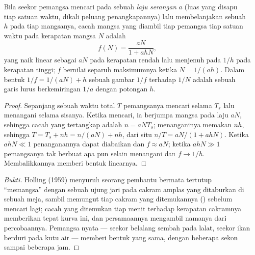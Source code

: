 \begin{theorem}\label{thm:b1:species-interactions:holling}
Bila seekor pemangsa mencari pada sebuah \emph{laju serangan} $a$
(luas yang disapu tiap satuan waktu, dikali peluang penangkapannya)
lalu membelanjakan sebuah  $h$ pada tiap mangsanya,
cacah mangsa yang diambil tiap pemangsa tiap satuan waktu pada
kerapatan mangsa $N$ adalah
\[
f(N) = \frac{aN}{1 + ahN} ,
\]
yang naik linear sebagai $aN$ pada kerapatan rendah lalu menjenuh pada
$1/h$ pada kerapatan tinggi; $f$ bernilai separuh maksimumnya ketika
$N = 1/(ah)$. Dalam bentuk $1/f = 1/(aN) + h$ sebuah gambar $1/f$
terhadap $1/N$ adalah sebuah garis lurus berkemiringan $1/a$ dengan
potongan $h$.
\end{theorem}
\begin{proof}
Sepanjang sebuah waktu total $T$ pemangsanya mencari selama $T_s$ lalu
menangani selama sisanya. Ketika mencari, ia berjumpa mangsa pada laju
$aN$, sehingga cacah yang tertangkap adalah $n = aN T_s$; menanganinya
memakan $nh$, sehingga $T = T_s + nh =
n/(aN) + nh$, dari situ $n/T = aN/(1 + ahN)$. Ketika $ahN \ll 1$
penanganannya dapat diabaikan dan $f \approx aN$; ketika $ahN \gg 1$
pemangsanya tak berbuat apa pun selain menangani dan $f \to 1/h$.
Membalikkannya memberi bentuk linearnya.
\end{proof}
\begin{proof}[Bukti]
Holling (1959) menyuruh seorang pembantu bermata tertutup ``memangsa''
dengan sebuah ujung jari pada cakram amplas yang ditaburkan di sebuah
meja, sambil memungut tiap cakram yang ditemukannya () sebelum mencari lagi; cacah yang ditemukan tiap menit
terhadap kerapatan cakramnya memberikan tepat kurva ini, dan
persamaannya mengambil namanya dari percobaannya. Pemangsa nyata ---
seekor belalang sembah pada lalat, seekor ikan berduri pada kutu air
--- memberi bentuk yang sama, dengan  beberapa sekon
sampai beberapa jam.
\end{proof}

